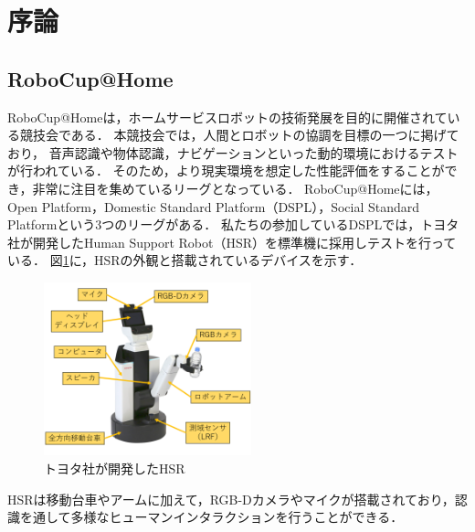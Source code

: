 \documentclass[a4j]{jarticle}
\begin{document}
\section{序論}
\subsection{RoboCup@Home}
RoboCup@Homeは，ホームサービスロボットの技術発展を目的に開催されている競技会である．
本競技会では，人間とロボットの協調を目標の一つに掲げており，
音声認識や物体認識，ナビゲーションといった動的環境におけるテストが行われている．
そのため，より現実環境を想定した性能評価をすることができ，非常に注目を集めているリーグとなっている．
RoboCup@Homeには，Open Platform，Domestic Standard Platform（DSPL），Social Standard Platformという3つのリーグがある．
私たちの参加しているDSPLでは，トヨタ社が開発したHuman Support Robot（HSR）\cite{hsr_paper}を標準機に採用しテストを行っている．
図\ref{overview_hsr}に，HSRの外観と搭載されているデバイスを示す．
\begin{figure}[ht]
  \centering
  \includegraphics[width=6cm]{images/hsr/hsr_explain_ja.png}
  \caption{トヨタ社が開発したHSR}
  \label{overview_hsr}
\end{figure}
HSRは移動台車やアームに加えて，RGB-Dカメラやマイクが搭載されており，認識を通して多様なヒューマンインタラクションを行うことができる．
\end{document}
